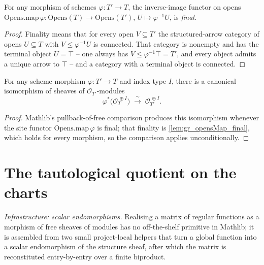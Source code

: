 \begin{lemma}
  \label{lem:gr_opensMap_final}
  For any morphism of schemes \(\varphi : T' \to T\), the inverse-image functor on opens
  \(\mathrm{Opens.map}\,\varphi : \mathrm{Opens}(T) \to \mathrm{Opens}(T')\),
  \(U \mapsto \varphi^{-1}U\), is \emph{final}.
\end{lemma}

\begin{proof}


\leanok
  Finality means that for every open \(V \subseteq T'\) the structured-arrow category of
  opens \(U \subseteq T\) with \(V \le \varphi^{-1}U\) is connected. That category is
  nonempty and has the terminal object \(U = \top\) -- one always has
  \(V \le \varphi^{-1}\top = T'\), and every object admits a unique arrow to \(\top\) --
  and a category with a terminal object is connected.
\end{proof}

\begin{lemma}
  \label{lem:gr_pullbackFreeIso}
  For any scheme morphism \(\varphi : T' \to T\) and index type \(I\), there is a canonical
  isomorphism of sheaves of \(\mathcal{O}_{T'}\)-modules
  \[
    \varphi^{*}\bigl(\mathcal{O}_T^{\,\oplus I}\bigr)
      \;\xrightarrow{\ \sim\ }\;
    \mathcal{O}_{T'}^{\,\oplus I}.
  \]
\end{lemma}

\begin{proof}
  \leanok
  Mathlib's pullback-of-free comparison produces this isomorphism whenever the site functor
  \(\mathrm{Opens.map}\,\varphi\) is final; that finality is \cref{lem:gr_opensMap_final},
  which holds for every morphism, so the comparison applies unconditionally.
\end{proof}


\section{The tautological quotient on the charts}
\label{sec:grquot_chart}

\emph{Infrastructure: scalar endomorphisms.} Realising a matrix of regular
functions as a morphism of free sheaves of modules has no off-the-shelf primitive
in Mathlib; it is assembled from two small project-local helpers that turn a global
function into a scalar endomorphism of the structure sheaf, after which the matrix
is reconstituted entry-by-entry over a finite biproduct.

